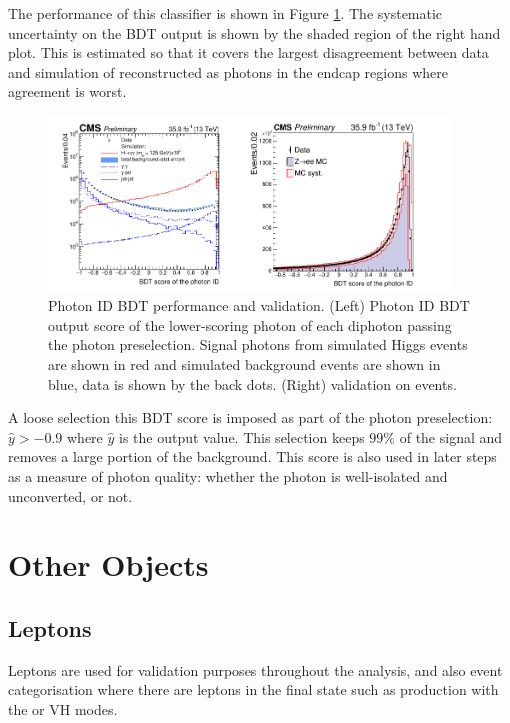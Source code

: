 The performance of this classifier is shown in Figure \ref{fig:object_reco:photon_id_bdt}. 
The systematic uncertainty on the BDT output is shown by the shaded region of the right hand plot. This is estimated so that it covers the largest disagreement between data and simulation of \Zee reconstructed as photons in the endcap regions where agreement is worst.
\begin{figure}[h!]
    \includegraphics[width=0.95\textwidth]{figures/object_reco/CMS-PAS-HIG-16-040_Figure_002.pdf}
    \caption{Photon ID BDT performance and validation. (Left) Photon ID BDT output score of the lower-scoring photon of each diphoton passing the photon preselection. Signal photons from simulated Higgs events are shown in red and simulated background events are shown in blue, data is shown by the back dots. (Right) validation on \Zee events.}
        \label{fig:object_reco:photon_id_bdt}
\end{figure}

A loose selection this BDT score is imposed as part of the photon preselection: $\hat{y} > -0.9$ where $\hat{y}$ is the output value. This selection keeps $99\%$ of the signal and removes a large portion of the background. This score is also used in later steps as a measure of photon quality: whether the photon is well-isolated and unconverted, or not. 


\section{Other Objects}

\subsection{Leptons}
Leptons are used for validation purposes throughout the analysis, and also event categorisation where there are leptons in the final state such as production with the \ttH or VH modes. 
